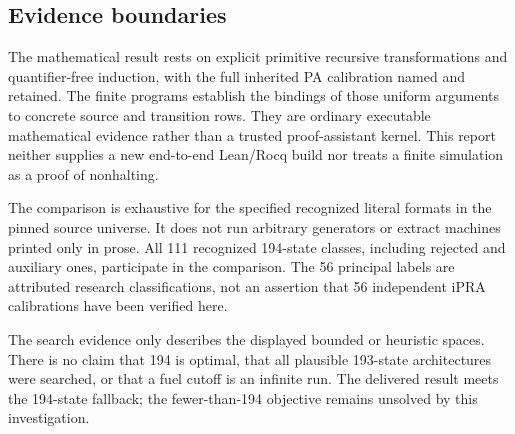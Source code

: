 \documentclass[10pt,a4paper]{article}
\begin{document}
\subsection{Evidence boundaries}

The mathematical result rests on explicit primitive recursive
transformations and quantifier-free induction, with the full
inherited PA calibration named and retained. The finite programs
establish the bindings of those uniform arguments to concrete source
and transition rows. They are ordinary executable mathematical
evidence rather than a trusted proof-assistant kernel. This report
neither supplies a new end-to-end Lean/Rocq build nor treats a finite
simulation as a proof of nonhalting.

The comparison is exhaustive for the specified recognized literal
formats in the pinned source universe. It does not run arbitrary
generators or extract machines printed only in prose. All 111
recognized 194-state classes, including rejected and auxiliary
ones, participate in the comparison. The 56 principal labels are
attributed research classifications, not an assertion that 56
independent iPRA calibrations have been verified here.

The search evidence only describes the displayed bounded or heuristic
spaces. There is no claim that 194 is optimal, that all plausible
193-state architectures were searched, or that a fuel cutoff is an
infinite run. The delivered result meets the 194-state fallback;
the fewer-than-194 objective remains unsolved by this investigation.
\end{document}
